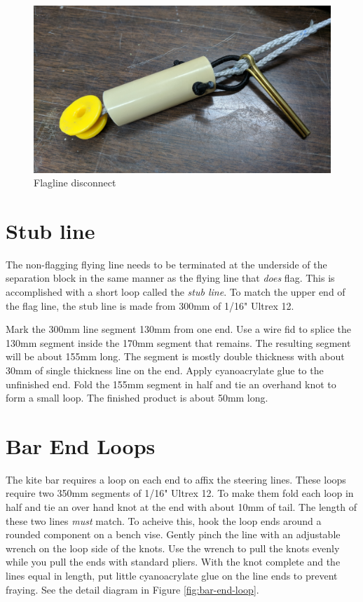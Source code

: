 \documentclass[]{book}
\begin{document}
\begin{figure}

{\centering \includegraphics[width=0.7\linewidth]{images/flagline_disconnect} 

}

\caption{Flagline disconnect}\label{fig:flagline-disconnect}
\end{figure}

\hypertarget{stub-line}{%
\section{Stub line}\label{stub-line}}

The non-flagging flying line needs to be terminated at the underside of the separation block in the same manner as the flying line that \emph{does} flag. This is accomplished with a short loop called the \emph{stub line}. To match the upper end of the flag line, the stub line is made from 300mm of 1/16" Ultrex 12.

Mark the 300mm line segment 130mm from one end. Use a wire fid to splice the 130mm segment inside the 170mm segment that remains. The resulting segment will be about 155mm long. The segment is mostly double thickness with about 30mm of single thickness line on the end. Apply cyanoacrylate glue to the unfinished end. Fold the 155mm segment in half and tie an overhand knot to form a small loop. The finished product is about 50mm long.

\hypertarget{bar-end-loops}{%
\section{Bar End Loops}\label{bar-end-loops}}

The kite bar requires a loop on each end to affix the steering lines. These loops require two 350mm segments of 1/16" Ultrex 12. To make them fold each loop in half and tie an over hand knot at the end with about 10mm of tail. The length of these two lines \emph{must} match. To acheive this, hook the loop ends around a rounded component on a bench vise. Gently pinch the line with an adjustable wrench on the loop side of the knots. Use the wrench to pull the knots evenly while you pull the ends with standard pliers. With the knot complete and the lines equal in length, put little cyanoacrylate glue on the line ends to prevent fraying. See the detail diagram in Figure \ref{fig:bar-end-loop}.
\end{document}
